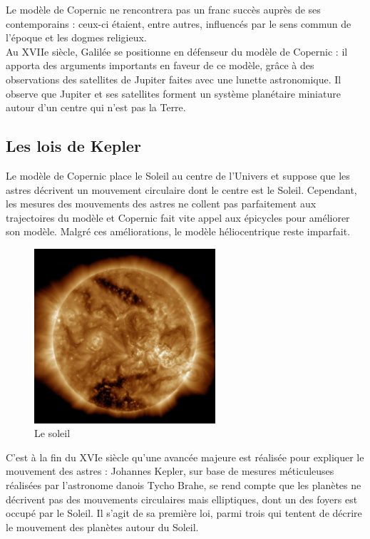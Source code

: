 \documentclass[
  letterpaper,
  DIV=11,
  numbers=noendperiod]{scrartcl}
\theoremstyle{definition}
\theoremstyle{definition}
\theoremstyle{definition}
\theoremstyle{remark}
\begin{document}
Le modèle de Copernic ne rencontrera pas un franc succès auprès de ses
contemporains : ceux-ci étaient, entre autres, influencés par le sens
commun de l'époque et les dogmes religieux.\\
Au XVIIe siècle, Galilée se positionne en défenseur du modèle de
Copernic : il apporta des arguments importants en faveur de ce modèle,
grâce à des observations des satellites de Jupiter faites avec une
lunette astronomique. Il observe que Jupiter et ses satellites forment
un système planétaire miniature autour d'un centre qui n'est pas la
Terre.

\subsection{Les lois de Kepler}\label{les-lois-de-kepler}

Le modèle de Copernic place le Soleil au centre de l'Univers et suppose
que les astres décrivent un mouvement circulaire dont le centre est le
Soleil. Cependant, les mesures des mouvements des astres ne collent pas
parfaitement aux trajectoires du modèle et Copernic fait vite appel aux
épicycles pour améliorer son modèle. Malgré ces améliorations, le modèle
héliocentrique reste imparfait.

\begin{figure}[H]

{\centering \includegraphics[width=0.6\textwidth,height=\textheight]{figures/grav/soleil.pdf}

}

\caption{Le soleil}

\end{figure}%

C'est à la fin du XVIe siècle qu'une avancée majeure est réalisée pour
expliquer le mouvement des astres : Johannes Kepler, sur base de mesures
méticuleuses réalisées par l'astronome danois Tycho Brahe, se rend
compte que les planètes ne décrivent pas des mouvements circulaires mais
elliptiques, dont un des foyers est occupé par le Soleil. Il s'agit de
sa première loi, parmi trois qui tentent de décrire le mouvement des
planètes autour du Soleil.
\end{document}
